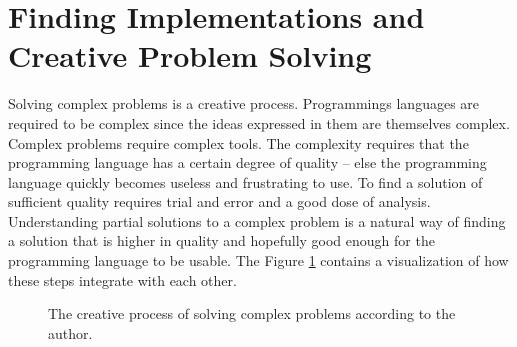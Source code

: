 \section{Finding Implementations and Creative Problem Solving}
Solving complex problems is a creative process. Programmings languages are required to be complex since the ideas expressed in them are themselves complex. Complex problems require complex tools. The complexity requires that the programming language
has a certain degree of quality -- else the programming language quickly becomes useless and frustrating to use. To find a solution of sufficient quality requires trial and error and a good dose of analysis. Understanding partial solutions to a complex problem is a natural way of finding a solution that is higher in quality and hopefully good enough for the programming language to be usable. The Figure \ref{figCreativeProcess} contains a visualization of how these steps integrate with each other.

\begin{center}
\begin{figure}[h!]
\centering
{}
\caption{The creative process of solving complex problems according to the author.}
\label{figCreativeProcess}
\end{figure}
\end{center}
